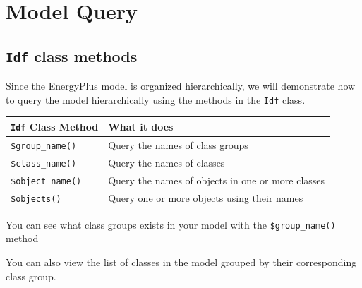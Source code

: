 \documentclass[
]{book}
\newenvironment{Shaded}{\begin{snugshade}}{\end{snugshade}}
\newcommand{\DocumentationTok}[1]{\textcolor[rgb]{0.56,0.35,0.01}{\textbf{\textit{#1}}}}
\newcommand{\FunctionTok}[1]{\textcolor[rgb]{0.00,0.00,0.00}{#1}}
\newcommand{\NormalTok}[1]{#1}
\newcommand{\SpecialCharTok}[1]{\textcolor[rgb]{0.00,0.00,0.00}{#1}}
\begin{document}
\hypertarget{model-query}{%
\section{Model Query}\label{model-query}}

\hypertarget{idf-class-methods}{%
\subsection{\texorpdfstring{\texttt{Idf} class methods}{Idf class methods}}\label{idf-class-methods}}

Since the EnergyPlus model is organized hierarchically, we will demonstrate how to query the model hierarchically using the methods in the \texttt{Idf} class.

\begin{longtable}[]{@{}ll@{}}
\toprule
\texttt{Idf} Class Method & What it does \\
\midrule
\endhead
\texttt{\$group\_name()} & Query the names of class groups \\
\texttt{\$class\_name()} & Query the names of classes \\
\texttt{\$object\_name()} & Query the names of objects in one or more classes \\
\texttt{\$objects()} & Query one or more objects using their names \\
\bottomrule
\end{longtable}

You can see what class groups exists in your model with the \texttt{\$group\_name()} method

\begin{Shaded}
\end{Shaded}

You can also view the list of classes in the model grouped by their corresponding class group.
\end{document}
